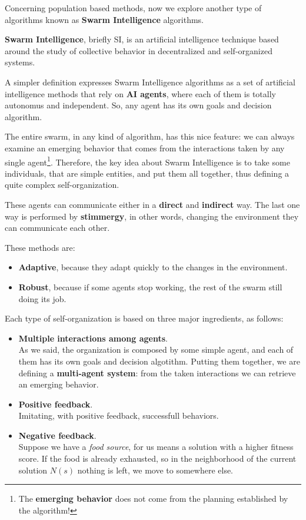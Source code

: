 Concerning population based methods, now we explore another type of algorithms known as \textbf{Swarm Intelligence} algorithms.
\begin{definition}
    \textbf{Swarm Intelligence}, briefly SI, is an artificial intelligence technique based around the study of collective behavior in decentralized and self-organized systems.
\end{definition}

A simpler definition expresses Swarm Intelligence algorithms as a set of artificial intelligence methods that rely on \textbf{AI agents}, where each of them is totally autonomus
and independent. So, any agent has its own goals and decision algorithm. \vspace{3.5pt}

The entire swarm, in any kind of algorithm, has this nice feature: we can always examine an emerging behavior that comes from the interactions taken by any single agent\footnote{The \textbf{emerging behavior} does not come from the planning established by the algorithm!}.
Therefore, the key idea about Swarm Intelligence is to take some individuals, that are simple entities, and put them all together, thus defining a quite complex self-organization. \vspace{3.5pt}

These agents can communicate either in a \textbf{direct} and \textbf{indirect} way. The last one way is performed by \textbf{stimmergy}, in other words, changing the environment 
they can communicate each other. \vspace{3.5pt}

These methods are:
\begin{itemize}[nosep]
    \renewcommand{\labelitemi}{-}
    \item \textbf{Adaptive}, because they adapt quickly to the changes in the environment.
    \item \textbf{Robust}, because if some agents stop working, the rest of the swarm still doing its job.  
\end{itemize}

Each type of self-organization is based on three major ingredients, as follows:
\begin{itemize}[nosep]
    \renewcommand{\labelitemi}{-}
    \item \textbf{Multiple interactions among agents}. \\ As we said, the organization is composed by some simple agent, and each of them has its own goals and decision algotithm. Putting them together, we are defining a \textbf{multi-agent system}: from the taken interactions we can retrieve an emerging behavior.
    \item \textbf{Positive feedback}. \\ Imitating, with positive feedback, successfull behaviors. 
    \item \textbf{Negative feedback}. \\ Suppose we have a \textit{food source}, for us means a solution with a higher fitness score. If the food is already exhausted, so in the neighborhood of the current solution $N(s)$ nothing is left, we move to somewhere else.
\end{itemize}

